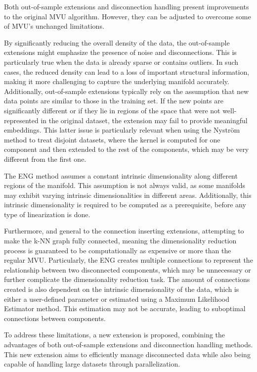 \label{chap:MVU-DM}


Both out-of-sample extensions and disconnection handling present improvements to the original \ac{MVU} algorithm. However, they can be adjusted to overcome some of \ac{MVU}'s unchanged limitations.

By significantly reducing the overall density of the data, the out-of-sample extensions might emphasize the presence of noise and disconnections. This is particularly true when the data is already sparse or contains outliers. In such cases, the reduced density can lead to a loss of important structural information, making it more challenging to capture the underlying manifold accurately. Additionally, out-of-sample extensions typically rely on the assumption that new data points are similar to those in the training set. If the new points are significantly different or if they lie in regions of the space that were not well-represented in the original dataset, the extension may fail to provide meaningful embeddings. This latter issue is particularly relevant when using the Nyström method to treat disjoint datasets, where the kernel is computed for one component and then extended to the rest of the components, which may be very different from the first one.

The \ac{ENG} method assumes a constant intrinsic dimensionality along different regions of the manifold. This assumption is not always valid, as some manifolds may exhibit varying intrinsic dimensionalities in different areas. Additionally, this intrinsic dimensionality is required to be computed as a prerequisite, before any type of linearization is done.

Furthermore, and general to the connection inserting extensions, attempting to make the k-NN graph fully connected, meaning the dimensionality reduction process is guaranteed to be computationally as expensive or more than the regular \ac{MVU}. Particularly, the \ac{ENG} creates multiple connections to represent the relationship between two disconnected components, which may be unnecessary or further complicate the dimensionality reduction task. The amount of connections created is also dependent on the intrinsic dimensionality of the data, which is either a user-defined parameter or estimated using a Maximum Likelihood Estimator method. This estimation may not be accurate, leading to suboptimal connections between components.

To address these limitations, a new extension is proposed, combining the advantages of both out-of-sample extensions and disconnection handling methods. This new extension aims to efficiently manage disconnected data while also being capable of handling large datasets through parallelization.

